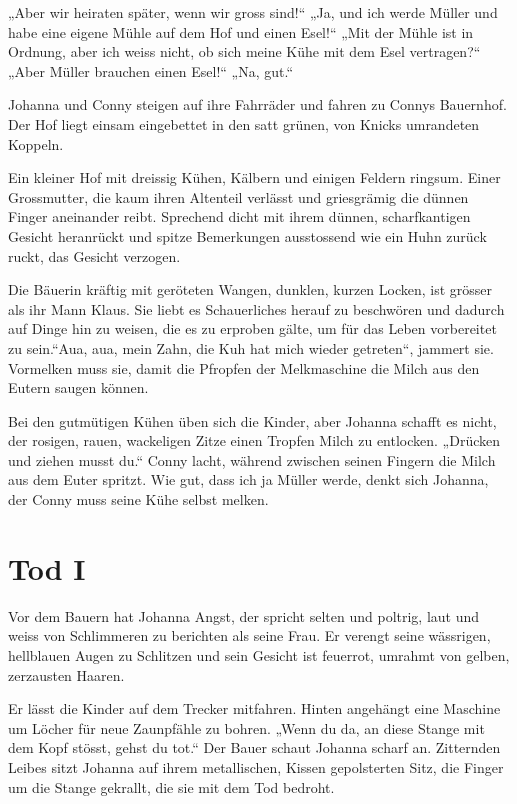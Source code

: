 „Aber wir heiraten später, wenn wir gross sind!“ „Ja, und ich werde Müller und habe eine eigene Mühle auf dem Hof und einen Esel!“ „Mit der Mühle ist in Ordnung, aber ich weiss nicht, ob sich meine Kühe mit dem Esel vertragen?“ „Aber Müller brauchen einen Esel!“ „Na, gut.“

Johanna und Conny steigen auf ihre Fahrräder und fahren zu Connys Bauernhof. Der Hof liegt einsam eingebettet in den satt grünen, von Knicks umrandeten Koppeln.

Ein kleiner Hof mit dreissig Kühen, Kälbern und einigen Feldern ringsum. Einer Grossmutter, die kaum ihren Altenteil verlässt und griesgrämig die dünnen Finger aneinander  reibt. Sprechend dicht mit ihrem dünnen, scharfkantigen Gesicht heranrückt und spitze Bemerkungen ausstossend wie ein Huhn zurück ruckt, das Gesicht verzogen.

Die Bäuerin kräftig mit geröteten Wangen, dunklen, kurzen Locken, ist grösser als ihr Mann Klaus. Sie liebt es Schauerliches herauf zu beschwören und dadurch auf Dinge hin zu weisen, die es zu erproben gälte, um für das Leben vorbereitet zu sein.“Aua, aua, mein Zahn, die Kuh hat mich wieder getreten“, jammert sie. Vormelken muss sie, damit die Pfropfen der Melkmaschine die Milch aus den Eutern saugen können.

Bei den gutmütigen Kühen üben sich die Kinder, aber Johanna schafft es nicht, der rosigen, rauen, wackeligen Zitze einen Tropfen Milch zu entlocken. „Drücken und ziehen musst du.“ Conny lacht, während zwischen seinen Fingern die Milch aus dem Euter spritzt. Wie gut, dass ich ja Müller werde, denkt sich Johanna, der Conny muss seine Kühe selbst melken.


\section*{Tod I}


Vor dem Bauern hat Johanna Angst, der spricht selten und poltrig, laut und weiss von Schlimmeren zu berichten als seine Frau. Er verengt seine wässrigen, hellblauen Augen zu Schlitzen und sein Gesicht ist feuerrot, umrahmt von gelben, zerzausten Haaren.

Er lässt die Kinder auf dem Trecker mitfahren. Hinten angehängt eine Maschine um Löcher für neue Zaunpfähle zu bohren. „Wenn du da, an diese Stange mit dem Kopf stösst, gehst du tot.“ Der Bauer schaut Johanna scharf an. Zitternden Leibes sitzt Johanna auf ihrem metallischen, Kissen gepolsterten Sitz, die Finger um die Stange gekrallt, die sie mit dem Tod bedroht.


